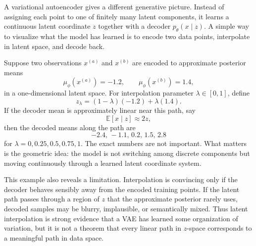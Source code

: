 A variational autoencoder gives a different generative picture.
Instead of assigning each point to one of finitely many latent components, it learns a continuous latent coordinate $z$ together with a decoder $p_\theta(x\mid z)$.
A simple way to visualize what the model has learned is to encode two data points, interpolate in latent space, and decode back.

Suppose two observations $x^{(a)}$ and $x^{(b)}$ are encoded to approximate posterior means
\[
\mu_\phi(x^{(a)})=-1.2,
\qquad
\mu_\phi(x^{(b)})=1.4,
\]
in a one-dimensional latent space.
For interpolation parameter $\lambda\in[0,1]$, define
\[
z_\lambda=(1-\lambda)(-1.2)+\lambda(1.4).
\]
If the decoder mean is approximately linear near this path, say
\[
\mathbb{E}[x\mid z]\approx 2z,
\]
then the decoded means along the path are
\[
-2.4,\,-1.1,\,0.2,\,1.5,\,2.8
\]
for $\lambda=0,0.25,0.5,0.75,1$.
The exact numbers are not important.
What matters is the geometric idea: the model is not switching among discrete components but moving continuously through a learned latent coordinate system.

This example also reveals a limitation.
Interpolation is convincing only if the decoder behaves sensibly away from the encoded training points.
If the latent path passes through a region of $z$ that the approximate posterior rarely uses, decoded samples may be blurry, implausible, or semantically mixed.
Thus latent interpolation is strong evidence that a VAE has learned some organization of variation, but it is not a theorem that every linear path in $z$-space corresponds to a meaningful path in data space.

